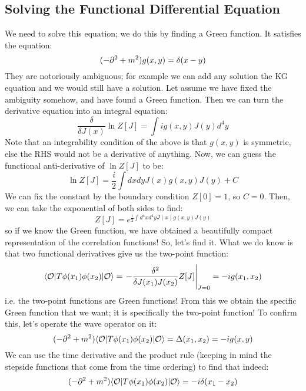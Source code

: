 \subsection{Solving the Functional Differential Equation}
We need to solve this equation; we do this by finding a Green function. It satisfies the equation:
\begin{equation}
    (-\partial^2 + m^2)g(x, y) = \delta(x - y)
\end{equation}
They are notoriously ambiguous; for example we can add any solution the KG equation and we would still have a solution. Let assume we have fixed the ambiguity somehow, and have found a Green function. Then we can turn the derivative equation into an integral equation:
\begin{equation}
    \frac{\delta}{\delta J(x)}\ln Z[J] = \int i g(x, y)J(y) d^4y
\end{equation}
Note that an integrability condition of the above is that $g(x, y)$ is symmetric, else the RHS would not be a derivative of anything. 
Now, we can guess the functional anti-derivative of $\ln Z[J]$ to be:
\begin{equation}
    \ln Z[J] = \frac{i}{2}\int dxdy J(x)g(x, y)J(y) + C
\end{equation}
We can fix the constant by the boundary condition $Z[0] = 1$, so $C = 0$. Then, we can take the exponential of both sides to find:
\begin{equation}
    Z[J] = e^{\frac{i}{2}\int d^4x d^4y J(x)g(x, y)J(y)}
\end{equation}
so if we know the Green function, we have obtained a beautifully compact representation of the correlation functions! So, let's find it. What we do know is that two functional derivatives give us the two-point function:
\begin{equation}
    \bra{\O}T\phi(x_1)\phi(x_2)\ket{\O} = \left.-\frac{\delta^2}{\delta J(x_1)J(x_2)} Z[J]\right|_{J=0} = -ig(x_1, x_2)
\end{equation}
i.e. the two-point functions are Green functions! From this we obtain the specific Green function that we want; it is specifically the two-point function! To confirm this, let's operate the wave operator on it:
\begin{equation}
    (-\p^2 + m^2)\bra{\O}T\phi(x_1)\phi(x_2)\ket{\O} = \Delta(x_1, x_2) = -ig(x, y)
\end{equation}
We can use the time derivative and the product rule (keeping in mind the stepside functions that come from the time ordering) to find that indeed:
\begin{equation}
    (-\p^2 + m^2)\bra{\O}T\phi(x_1)\phi(x_2)\ket{\O} = -i\delta(x_1 - x_2)
\end{equation}
